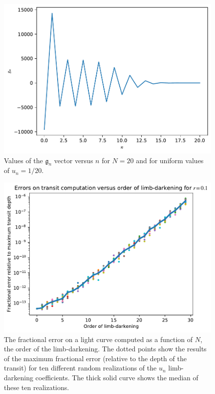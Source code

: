 \documentclass[modern,trackchanges]{aastex63}
\begin{document}
{\begin{figure}
    \begin{centering}
    \includegraphics[width=\linewidth]{figures/julia/g_n_vs_n.pdf}
    \caption{Values of the $\mathfrak{g}_n$ vector versus $n$ for $N=20$
    and for uniform values of $u_n = 1/20$.
    \label{fig:g_n_vs_n}}
    \end{centering}
\end{figure}

\begin{figure}
    \begin{centering}
    \includegraphics[width=\linewidth]{figures/julia/fractional_error_vs_order.pdf}
    \caption{The fractional error on a light curve computed as a function of
    $N$, the order of the limb-darkening.  The dotted points show the results of
    the maximum fractional error (relative to the depth of the transit) for ten
    different random realizations of the $u_n$ limb-darkening coefficients.  The
    thick solid curve shows the median of these ten realizations.
    \label{fig:fractional_error_vs_order}}
    \end{centering}
\end{figure}


}
\end{document}
